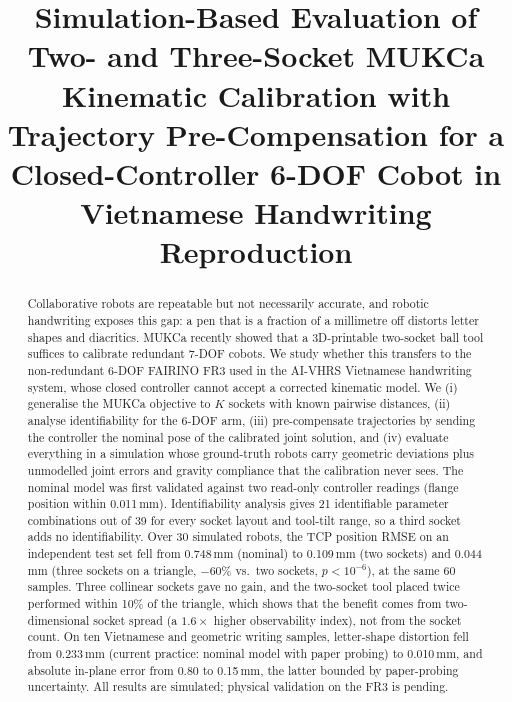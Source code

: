 \documentclass[conference]{IEEEtran}
\begin{document}
\title{Simulation-Based Evaluation of Two- and Three-Socket MUKCa Kinematic Calibration with Trajectory Pre-Compensation for a Closed-Controller 6-DOF Cobot in Vietnamese Handwriting Reproduction}

\author{\IEEEauthorblockN{[Author 1]\textsuperscript{*}, [Author 2], [Author 3]}
\and
{}
}

\maketitle

\begin{abstract}
Collaborative robots are repeatable but not necessarily accurate, and robotic handwriting exposes this gap: a pen that is
a fraction of a millimetre off distorts letter shapes and diacritics. MUKCa recently showed that a 3D-printable two-socket
ball tool suffices to calibrate redundant 7-DOF cobots. We study whether this transfers to the non-redundant 6-DOF FAIRINO
FR3 used in the AI-VHRS Vietnamese handwriting system, whose closed controller cannot accept a corrected kinematic model.
We (i) generalise the MUKCa objective to $K$ sockets with known pairwise distances, (ii) analyse identifiability for the
6-DOF arm, (iii) pre-compensate trajectories by sending the controller the nominal pose of the calibrated joint solution,
and (iv) evaluate everything in a simulation whose ground-truth robots carry geometric deviations plus unmodelled joint
errors and gravity compliance that the calibration never sees. The nominal model was first validated against two
read-only controller readings (flange position within 0.011\,mm). Identifiability analysis gives 21 identifiable parameter
combinations out of 39 for every socket layout and tool-tilt range, so a third socket adds no identifiability.
Over 30 simulated robots, the TCP position RMSE on an independent test set fell from 0.748\,mm (nominal) to 0.109\,mm
(two sockets) and 0.044\,mm (three sockets on a triangle, $-60\%$ vs.\ two sockets, $p<10^{-6}$), at the same 60 samples.
Three collinear sockets gave no gain, and the two-socket tool placed twice performed within 10\% of the triangle,
which shows that the benefit comes from two-dimensional socket spread (a $1.6\times$ higher observability index), not from the
socket count. On ten Vietnamese and geometric writing samples, letter-shape distortion fell from 0.233\,mm
(current practice: nominal model with paper probing) to 0.010\,mm, and absolute in-plane error from 0.80 to 0.15\,mm,
the latter bounded by paper-probing uncertainty. All results are simulated; physical validation on the FR3 is pending.
\end{abstract}
\end{document}
